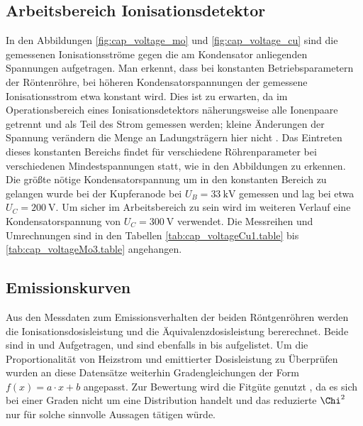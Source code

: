 \subsection{Arbeitsbereich Ionisationsdetektor}
In den Abbildungen \ref{fig:cap_voltage_mo} und \ref{fig:cap_voltage_cu} sind die gemessenen Ionisationsströme gegen die am Kondensator anliegenden Spannungen aufgetragen. Man erkennt, dass bei konstanten Betriebsparametern der Röntenröhre, bei höheren Kondensatorspannungen der gemessene Ionisationsstrom etwa konstant wird. Dies ist zu erwarten, da im Operationsbereich eines Ionisationsdetektors näherungsweise alle Ionenpaare getrennt und als Teil des Strom gemessen werden; kleine Änderungen der Spannung verändern die Menge an Ladungsträgern hier nicht \cite[195]{kolanoskiwermerdetektoren}. Das Eintreten dieses konstanten Bereichs findet für verschiedene Röhrenparameter bei verschiedenen Mindestspannungen statt, wie in den Abbildungen zu erkennen. Die größte nötige Kondensatorspannung um in den konstanten Bereich zu gelangen wurde bei der Kupferanode bei $U_B = \SI{33}{\kilo\volt}$ gemessen und lag bei etwa $U_C = \SI{200}{\volt}$. Um sicher im Arbeitsbereich zu sein wird im weiteren Verlauf eine Kondensatorspannung von $U_C=\SI{300}{\volt}$ verwendet. Die Messreihen und Umrechnungen sind in den Tabellen \ref{tab:cap_voltageCu1.table} bis \ref{tab:cap_voltageMo3.table} angehangen.



\subsection{Emissionskurven}


Aus den Messdaten zum Emissionsverhalten der beiden Röntgenröhren werden die Ionisationsdosisleistung und die Äquivalenzdosisleistung bererechnet. Beide sind in  und  Aufgetragen, und sind ebenfalls in  bis  aufgelistet. Um die Proportionalität von Heizstrom und emittierter Dosisleistung zu Überprüfen wurden an diese Datensätze weiterhin Gradengleichungen der Form $f(x) = a \cdot x + b$ angepasst. Zur Bewertung wird die Fitgüte genutzt \cite{rsquared}, da es sich bei einer Graden nicht um eine Distribution handelt und das reduzierte $\Chi^2$ nur für solche sinnvolle Aussagen tätigen würde\cite{chisquare}.

